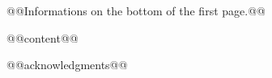 \documentclass[prodmode,acmtap]{acmlarge}
\author{￼@@author 1@@
\affil{@@affiliation@@￼}
￼@@autho 2r@@
\affil{￼@@affiliation@@}
}
\begin{document}
\begin{bottomstuff}
@@Informations on the bottom of the first page.@@
\end{bottomstuff}

\maketitle

@@content@@

\begin{acks}
@@acknowledgments@@
\end{acks}



\end{document}
